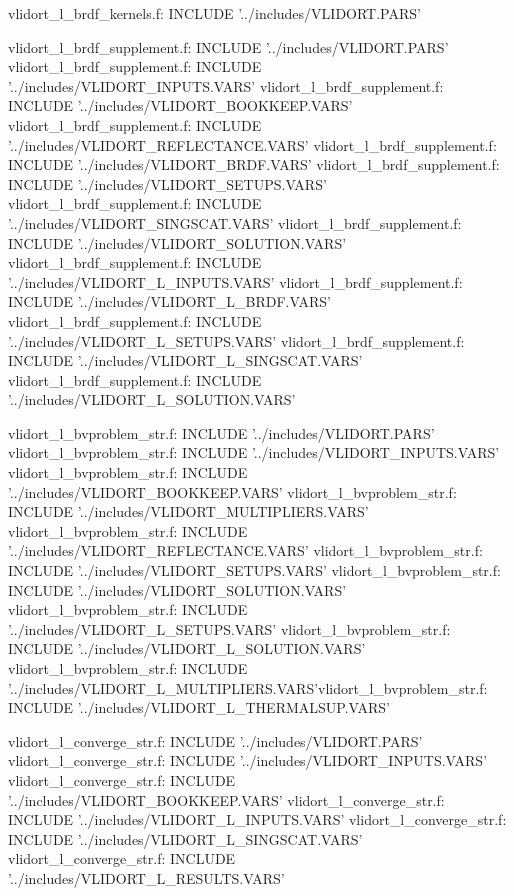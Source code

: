 vlidort_l_brdf_kernels.f:      INCLUDE '../includes/VLIDORT.PARS'

vlidort_l_brdf_supplement.f:      INCLUDE '../includes/VLIDORT.PARS'
vlidort_l_brdf_supplement.f:      INCLUDE '../includes/VLIDORT_INPUTS.VARS'
vlidort_l_brdf_supplement.f:      INCLUDE '../includes/VLIDORT_BOOKKEEP.VARS'
vlidort_l_brdf_supplement.f:      INCLUDE '../includes/VLIDORT_REFLECTANCE.VARS'
vlidort_l_brdf_supplement.f:      INCLUDE '../includes/VLIDORT_BRDF.VARS'
vlidort_l_brdf_supplement.f:      INCLUDE '../includes/VLIDORT_SETUPS.VARS'
vlidort_l_brdf_supplement.f:      INCLUDE '../includes/VLIDORT_SINGSCAT.VARS'
vlidort_l_brdf_supplement.f:      INCLUDE '../includes/VLIDORT_SOLUTION.VARS'
vlidort_l_brdf_supplement.f:      INCLUDE '../includes/VLIDORT_L_INPUTS.VARS'
vlidort_l_brdf_supplement.f:      INCLUDE '../includes/VLIDORT_L_BRDF.VARS'
vlidort_l_brdf_supplement.f:      INCLUDE '../includes/VLIDORT_L_SETUPS.VARS'
vlidort_l_brdf_supplement.f:      INCLUDE '../includes/VLIDORT_L_SINGSCAT.VARS'
vlidort_l_brdf_supplement.f:      INCLUDE '../includes/VLIDORT_L_SOLUTION.VARS'

vlidort_l_bvproblem_str.f:      INCLUDE '../includes/VLIDORT.PARS'
vlidort_l_bvproblem_str.f:      INCLUDE '../includes/VLIDORT_INPUTS.VARS'
vlidort_l_bvproblem_str.f:      INCLUDE '../includes/VLIDORT_BOOKKEEP.VARS'
vlidort_l_bvproblem_str.f:      INCLUDE '../includes/VLIDORT_MULTIPLIERS.VARS'
vlidort_l_bvproblem_str.f:      INCLUDE '../includes/VLIDORT_REFLECTANCE.VARS'
vlidort_l_bvproblem_str.f:      INCLUDE '../includes/VLIDORT_SETUPS.VARS'
vlidort_l_bvproblem_str.f:      INCLUDE '../includes/VLIDORT_SOLUTION.VARS'
vlidort_l_bvproblem_str.f:      INCLUDE '../includes/VLIDORT_L_SETUPS.VARS'
vlidort_l_bvproblem_str.f:      INCLUDE '../includes/VLIDORT_L_SOLUTION.VARS'
vlidort_l_bvproblem_str.f:      INCLUDE '../includes/VLIDORT_L_MULTIPLIERS.VARS'vlidort_l_bvproblem_str.f:      INCLUDE '../includes/VLIDORT_L_THERMALSUP.VARS'


vlidort_l_converge_str.f:      INCLUDE '../includes/VLIDORT.PARS'
vlidort_l_converge_str.f:      INCLUDE '../includes/VLIDORT_INPUTS.VARS'
vlidort_l_converge_str.f:      INCLUDE '../includes/VLIDORT_BOOKKEEP.VARS'
vlidort_l_converge_str.f:      INCLUDE '../includes/VLIDORT_L_INPUTS.VARS'
vlidort_l_converge_str.f:      INCLUDE '../includes/VLIDORT_L_SINGSCAT.VARS'
vlidort_l_converge_str.f:      INCLUDE '../includes/VLIDORT_L_RESULTS.VARS'

